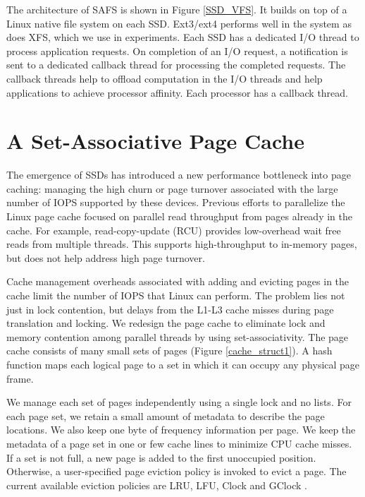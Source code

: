 The architecture of SAFS is shown in Figure \ref{SSD_VFS}.
It builds on top of a Linux native file system on each SSD.
Ext3/ext4 performs well in the system as does XFS, which we use in experiments. 
Each SSD has a dedicated I/O thread to process application requests.
On completion of an I/O request, a notification is sent to a dedicated callback
thread for processing the completed requests. The callback threads help to
offload computation in the I/O threads and help applications to achieve processor
affinity. Each processor has a callback thread.

\section{A Set-Associative Page Cache}

The emergence of SSDs has introduced a new performance bottleneck into
page caching: managing the high churn or page turnover associated with
the large number of IOPS supported by these devices. Previous efforts
to parallelize the Linux page cache focused on parallel read throughput
from pages already in the cache. For example, read-copy-update (RCU) \cite{rcu}
provides low-overhead wait free reads from multiple threads. This supports
high-throughput to in-memory pages, but does not help address high page
turnover.

Cache management overheads associated with adding and evicting pages in
the cache limit the number of IOPS that Linux can perform. The problem lies
not just in lock contention, but delays from the L1-L3 cache misses during
page translation and locking.
We redesign the page cache to eliminate lock and
memory contention among parallel threads by using set-associativity.
The page cache consists of many small sets of pages (Figure \ref{cache_struct1}).
A hash function maps each logical page to a set in which it can occupy
any physical page frame. 

We manage each set of pages independently using a single lock and no lists.
For each page set, we retain a small amount of metadata to describe the page
locations. We also keep one byte of frequency information per page.
We keep the metadata of a page set in one or few cache lines to minimize
CPU cache misses. If a set
is not full, a new page is added to the first unoccupied position. Otherwise,
a user-specified page eviction policy is invoked to evict a page.
The current available eviction policies are LRU, LFU, Clock \cite{clock} and
GClock \cite{gclock}.

